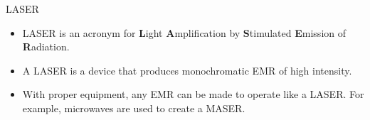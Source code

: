 {\Large LASER}
\begin{itemize}

\item LASER is an acronym for {\bfseries L}ight {\bfseries A}mplification by {\bfseries S}timulated {\bfseries E}mission of {\bfseries R}adiation.
\item A LASER is a device that produces monochromatic EMR of high intensity.
\item With proper equipment, any EMR can be made to operate like a LASER. For example, microwaves are used to create a MASER.


\end{itemize}
